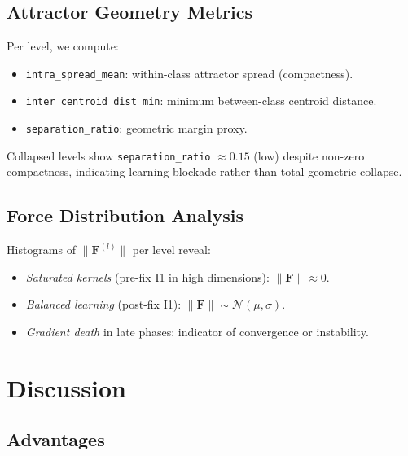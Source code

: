 \documentclass[11pt,a4paper]{article}
\begin{document}
\subsection{Attractor Geometry Metrics}

Per level, we compute:
\begin{itemize}
  \item \texttt{intra\_spread\_mean}: within-class attractor spread (compactness).
  \item \texttt{inter\_centroid\_dist\_min}: minimum between-class centroid distance.
  \item \texttt{separation\_ratio}: geometric margin proxy.
\end{itemize}

Collapsed levels show \texttt{separation\_ratio} $\approx 0.15$ (low) despite non-zero
compactness, indicating learning blockade rather than total geometric collapse.

\subsection{Force Distribution Analysis}

Histograms of $\|\mathbf{F}^{(l)}\|$ per level reveal:
\begin{itemize}
  \item \textit{Saturated kernels} (pre-fix I1 in high dimensions): $\|\mathbf{F}\| \approx 0$.
  \item \textit{Balanced learning} (post-fix I1): $\|\mathbf{F}\| \sim \mathcal{N}(\mu,\sigma)$.
  \item \textit{Gradient death} in late phases: indicator of convergence or instability.
\end{itemize}

\section{Discussion}

\subsection{Advantages}
\end{document}
